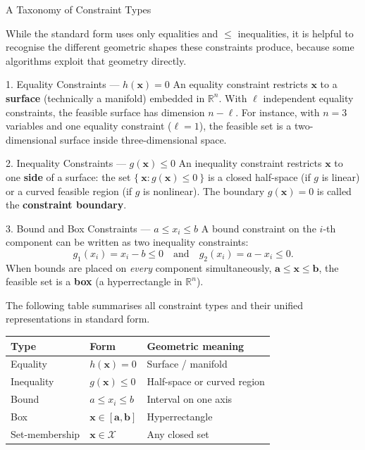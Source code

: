 \documentclass[aspectratio=169,10pt]{beamer}
\newcommand{\R}{\mathbb{R}}
\newcommand{\bx}{\mathbf{x}}
\begin{document}
\begin{frame}[allowframebreaks]{A Taxonomy of Constraint Types}

  While the standard form uses only equalities and $\le$ inequalities, it is
  helpful to recognise the different geometric shapes these constraints produce,
  because some algorithms exploit that geometry directly.

  \begin{block}{1. Equality Constraints --- $h(\bx) = 0$}
    An equality constraint restricts $\bx$ to a \textbf{surface} (technically a
    manifold) embedded in $\R^n$.  With $\ell$ independent equality constraints,
    the feasible surface has dimension $n - \ell$.  For instance, with $n = 3$
    variables and one equality constraint ($\ell = 1$), the feasible set is a
    two-dimensional surface inside three-dimensional space.
  \end{block}

  \begin{block}{2. Inequality Constraints --- $g(\bx) \le 0$}
    An inequality constraint restricts $\bx$ to one \textbf{side} of a surface:
    the set $\{\ \bx : g(\bx) \le 0\ \}$ is a closed half-space (if $g$ is
    linear) or a curved feasible region (if $g$ is nonlinear).  The boundary
    $g(\bx) = 0$ is called the \textbf{constraint boundary}.
  \end{block}

  \begin{block}{3. Bound and Box Constraints --- $a \le x_i \le b$}
    A bound constraint on the $i$-th component can be written as two inequality
    constraints:
    \[
      g_1(x_i) = x_i - b \le 0 \quad\text{and}\quad g_2(x_i) = a - x_i \le 0.
    \]
    When bounds are placed on \emph{every} component simultaneously,
    $\mathbf{a} \le \bx \le \mathbf{b}$, the feasible set is a
    \textbf{box} (a hyperrectangle in $\R^n$).
  \end{block}

  \framebreak

  The following table summarises all constraint types and their unified
  representations in standard form.

  \vspace{6pt}
  \begin{tabular}{lll}
    \toprule
    \textbf{Type}   & \textbf{Form}              & \textbf{Geometric meaning} \\
    \midrule
    Equality        & $h(\bx) = 0$               & Surface / manifold \\
    Inequality      & $g(\bx) \le 0$             & Half-space or curved region \\
    Bound           & $a \le x_i \le b$          & Interval on one axis \\
    Box             & $\bx \in [\mathbf{a}, \mathbf{b}]$ & Hyperrectangle \\
    Set-membership  & $\bx \in \mathcal{X}$      & Any closed set \\
    \bottomrule
  \end{tabular}


\end{frame}
\end{document}
